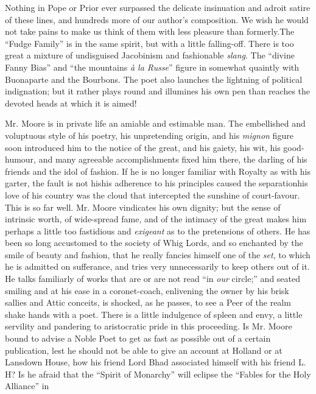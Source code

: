 Nothing in Pope or Prior ever surpassed the delicate insinuation
and adroit satire of these lines, and hundreds more of our author's
composition. We wish he would not take pains to make us think of them
with less pleasure than formerly.\textemdash The ``Fudge Family'' is in the same
spirit, but with a little falling-off. There is too great a mixture of
undisguised Jacobinism and fashionable \emph{slang}. The ``divine Fanny Bias''
and ``the mountains \emph{à la Russe}'' figure in somewhat quaintly with
Buonaparte and the Bourbons. The poet also launches the lightning of
political indignation; but it rather plays round and illumines his own
pen than reaches the devoted heads at which it is aimed!

Mr. Moore is in private life an amiable and estimable man. The
embellished and voluptuous style of his poetry, his unpretending origin,
and his \emph{mignon} figure soon introduced him to the notice of the
great, and his gaiety, his wit, his good-humour, and many agreeable
accomplishments fixed him there, the darling of his friends and the idol
of fashion. If he is no longer familiar with Royalty as with his garter,
the fault is not his\textemdash his adherence to his principles caused the
separation\textemdash his love of his country was the cloud that intercepted the
sunshine of court-favour. This is so far well. Mr. Moore vindicates his
own dignity; but the sense of intrinsic worth, of wide-spread fame, and
of the intimacy of the great makes him perhaps a little too fastidious
and \emph{exigeant} as to the pretensions of others. He has been so long
accustomed to the society of Whig Lords, and so enchanted by the smile
of beauty and fashion, that he really fancies himself one of the \emph{set},
to which he is admitted on sufferance, and tries very unnecessarily to
keep others out of it. He talks familiarly of works that are or are
not read ``in \emph{our} circle;'' and seated smiling and at his ease in a
coronet-coach, enlivening the owner by his brisk sallies and Attic
conceits, is shocked, as he passes, to see a Peer of the realm shake
hands with a poet. There is a little indulgence of spleen and envy, a
little servility and pandering to aristocratic pride in this proceeding.
Is Mr. Moore bound to advise a Noble Poet to get as fast as possible out
of a certain publication, lest he should not be able to give an
account at Holland or at Lansdown House, how his friend Lord B\textemdash \textemdash had
associated himself with his friend L. H\textemdash \textemdash ? Is he afraid that the
``Spirit of Monarchy'' will eclipse the ``Fables for the Holy Alliance'' in
